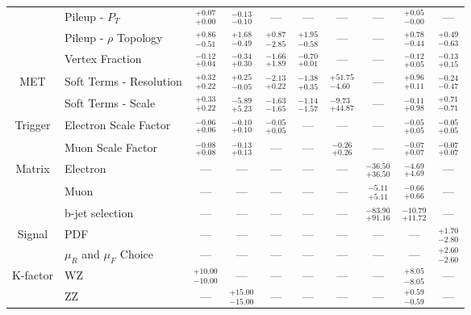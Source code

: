 \begin{tabular}{|cl||cccccc|c||c|}
\cline{2-10}
&Pileup -  $P_{T}$ &  $^{+0.07}_{+0.00}$  &  $^{-0.13}_{-0.10}$  & --- & --- & --- & --- &  $^{+0.05}_{-0.00}$  & ---\\ 
\cline{2-10}
&Pileup - $\rho$ Topology &  $^{+0.86}_{-0.51}$  &  $^{+1.68}_{-0.49}$  &  $^{+0.87}_{-2.85}$  &  $^{+1.95}_{-0.58}$  & --- & --- &  $^{+0.78}_{-0.44}$  &  $^{+0.49}_{-0.63}$ \\ 
\cline{2-10}
&Vertex Fraction &  $^{-0.12}_{+0.04}$  &  $^{-0.34}_{+0.30}$  &  $^{-1.66}_{+1.89}$  &  $^{-0.70}_{+0.01}$  & --- & --- &  $^{-0.12}_{+0.05}$  &  $^{-0.13}_{+0.15}$ \\ 
\hline
\multirow{2}{*}{MET}
&Soft Terms - Resolution &  $^{+0.32}_{+0.22}$  &  $^{+0.25}_{-0.05}$  &  $^{-2.13}_{+0.22}$  &  $^{-1.38}_{+0.35}$  &  $^{+51.75}_{-4.60}$  & --- &  $^{+0.96}_{+0.11}$  &  $^{-0.24}_{-0.47}$ \\ 
\cline{2-10}
&Soft Terms - Scale &  $^{+0.33}_{+0.22}$  &  $^{-5.89}_{+5.23}$  &  $^{-1.63}_{-1.65}$  &  $^{-1.14}_{-1.57}$  &  $^{-9.73}_{+44.87}$  & --- &  $^{-0.11}_{+0.98}$  &  $^{+0.71}_{-0.71}$ \\ 
\hline
\multirow{2}{*}{Trigger}
&Electron Scale Factor &  $^{-0.06}_{+0.06}$  &  $^{-0.10}_{+0.10}$  &  $^{-0.05}_{+0.05}$  & --- & --- & --- &  $^{-0.05}_{+0.05}$  &  $^{-0.05}_{+0.05}$ \\ 
\cline{2-10}
&Muon Scale Factor &  $^{-0.08}_{+0.08}$  &  $^{-0.13}_{+0.13}$  & --- & --- &  $^{-0.26}_{+0.26}$  & --- &  $^{-0.07}_{+0.07}$  &  $^{-0.07}_{+0.07}$ \\ 
\hline
\multirow{2}{*}{Matrix}
&Electron & --- & --- & --- & --- & --- &  $^{-36.50}_{+36.50}$  &  $^{-4.69}_{+4.69}$  & ---\\ 
\cline{2-10}
\multirow{2}{*}{Method}
&Muon & --- & --- & --- & --- & --- &  $^{-5.11}_{+5.11}$  &  $^{-0.66}_{+0.66}$  & ---\\ 
\cline{2-10}
&b-jet selection & --- & --- & --- & --- & --- &  $^{-83.90}_{+91.16}$  &  $^{-10.79}_{+11.72}$  & ---\\ 
\hline
\multirow{2}{*}{Signal}
&PDF & --- & --- & --- & --- & --- & --- & --- &  $^{+1.70}_{-2.80}$ \\ 
\cline{2-10}
&$\mu_{R}$ and $\mu_{F}$ Choice & --- & --- & --- & --- & --- & --- & --- &  $^{+2.60}_{-2.60}$ \\ 
\hline
\multirow{2}{*}{K-factor}
&WZ &  $^{+10.00}_{-10.00}$  & --- & --- & --- & --- & --- &  $^{+8.05}_{-8.05}$  & ---\\ 
\cline{2-10}
&ZZ & --- &  $^{+15.00}_{-15.00}$  & --- & --- & --- & --- &  $^{+0.59}_{-0.59}$  & ---\\ 

\end{tabular}
